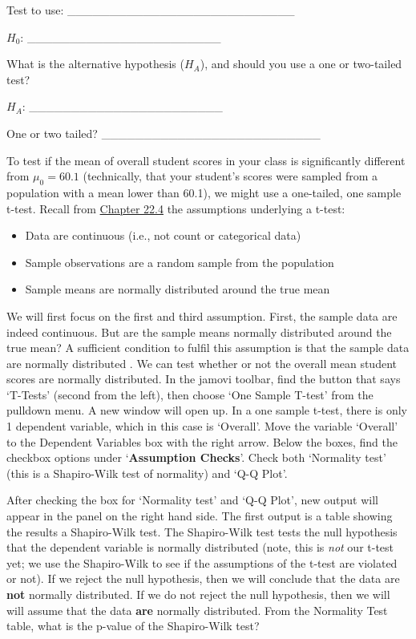 \documentclass[
  openany]{krantz}
\providecommand{\tightlist}{%
  \setlength{\itemsep}{0pt}\setlength{\parskip}{0pt}}
\begin{document}
Test to use: \_\_\_\_\_\_\_\_\_\_\_\_\_\_\_\_\_\_\_\_\_\_\_\_\_\_\_

\(H_{0}\): \_\_\_\_\_\_\_\_\_\_\_\_\_\_\_\_\_\_\_\_\_\_\_

What is the alternative hypothesis (\(H_{A}\)), and should you use a one or two-tailed test?

\(H_{A}\): \_\_\_\_\_\_\_\_\_\_\_\_\_\_\_\_\_\_\_\_\_\_\_

One or two tailed? \_\_\_\_\_\_\_\_\_\_\_\_\_\_\_\_\_\_\_\_\_\_\_\_\_\_

To test if the mean of overall student scores in your class is significantly different from \(\mu_{0} = 60.1\) (technically, that your student's scores were sampled from a population with a mean lower than 60.1), we might use a one-tailed, one sample t-test.
Recall from \protect\hyperlink{assumptions-of-t-tests}{Chapter 22.4} the assumptions underlying a t-test:

\begin{itemize}
\tightlist
\item
  Data are continuous (i.e., not count or categorical data)
\item
  Sample observations are a random sample from the population
\item
  Sample means are normally distributed around the true mean
\end{itemize}

We will first focus on the first and third assumption.
First, the sample data are indeed continuous.
But are the sample means normally distributed around the true mean?
A sufficient condition to fulfil this assumption is that the sample data are normally distributed \citep{Johnson1995, Lumley2002}.
We can test whether or not the overall mean student scores are normally distributed.
In the jamovi toolbar, find the button that says `T-Tests' (second from the left), then choose `One Sample T-test' from the pulldown menu.
A new window will open up.
In a one sample t-test, there is only 1 dependent variable, which in this case is `Overall'.
Move the variable `Overall' to the Dependent Variables box with the right arrow.
Below the boxes, find the checkbox options under `\textbf{Assumption Checks}'.
Check both `Normality test' (this is a Shapiro-Wilk test of normality) and `Q-Q Plot'.

After checking the box for `Normality test' and `Q-Q Plot', new output will appear in the panel on the right hand side.
The first output is a table showing the results a Shapiro-Wilk test.
The Shapiro-Wilk test tests the null hypothesis that the dependent variable is normally distributed (note, this is \emph{not} our t-test yet; we use the Shapiro-Wilk to see if the assumptions of the t-test are violated or not).
If we reject the null hypothesis, then we will conclude that the data are \textbf{not} normally distributed.
If we do not reject the null hypothesis, then we will will assume that the data \textbf{are} normally distributed.
From the Normality Test table, what is the p-value of the Shapiro-Wilk test?
\end{document}
